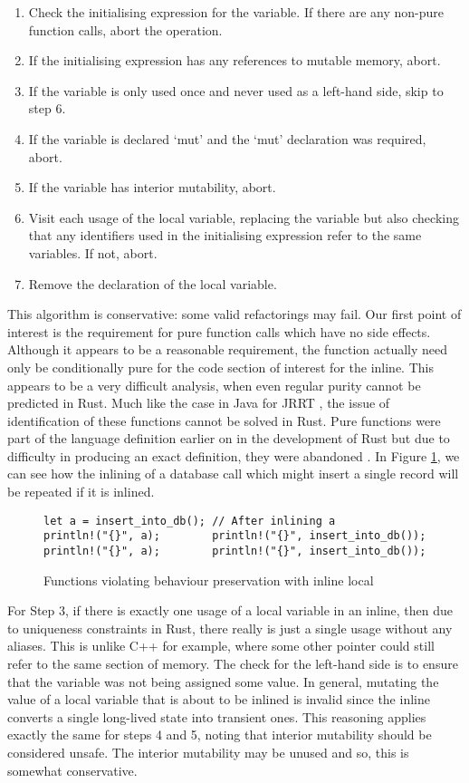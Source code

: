 \begin{enumerate} 
\item Check the initialising expression for the variable. If there are any non-pure function calls, abort the operation.
\item If the initialising expression has any references to mutable memory, abort.
\item If the variable is only used once and never used as a left-hand side, skip to step 6.
\item If the variable is declared `mut' and the `mut' declaration was required, abort.
\item If the variable has interior mutability, abort.
\item Visit each usage of the local variable, replacing the variable but also checking that any identifiers used in the initialising expression refer to the same variables. If not, abort.
\item Remove the declaration of the local variable.
\end{enumerate}

This algorithm is conservative: some valid refactorings may fail. Our first point of interest is the requirement for pure function calls which have no side effects. Although it appears to be a reasonable requirement, the function actually need only be conditionally pure for the code section of interest for the inline. This appears to be a very difficult analysis, when even regular purity cannot be predicted in Rust. Much like the case in Java for JRRT \cite{schafer2010specification}, the issue of identification of these functions cannot be solved in Rust. Pure functions were part of the language definition earlier on in the development of Rust but due to difficulty in producing an exact definition, they were abandoned \cite{pwalton}. In Figure \ref{Fig:funcinline}, we can see how the inlining of a database call which might insert a single record will be repeated if it is inlined.

\begin{figure}[h]
\begin{verbatim}
let a = insert_into_db(); // After inlining a
println!("{}", a);        println!("{}", insert_into_db());
println!("{}", a);        println!("{}", insert_into_db());
\end{verbatim}
\caption{Functions violating behaviour preservation with inline local}
\label{Fig:funcinline}
\end{figure}

For Step 3, if there is exactly one usage of a local variable in an inline, then due to uniqueness constraints in Rust, there really is just a single usage without any aliases. This is unlike C++ for example, where some other pointer could still refer to the same section of memory. The check for the left-hand side is to ensure that the variable was not being assigned some value. In general, mutating the value of a local variable that is about to be inlined is invalid since the inline converts a single long-lived state into transient ones. This reasoning applies exactly the same for steps 4 and 5, noting that interior mutability should be considered unsafe. The interior mutability may be unused and so, this is somewhat conservative.

